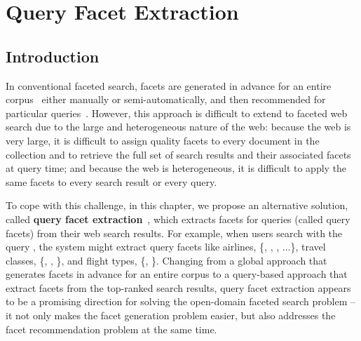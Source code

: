 \chapter{Query Facet Extraction}
\label{ch:facet}
\section{Introduction}
In conventional faceted search, facets are generated in advance for an entire corpus~\cite{stoica2007automating,dakka2008automatic} either manually or semi-automatically, and then recommended for particular queries~\cite{teevan2008challenges}. However, this approach is difficult to extend to faceted web search due to the large and heterogeneous nature of the web: because the web is very large, it is
difficult to assign quality facets to every document in the collection and to retrieve the full set of search results and their associated facets at query time; and because the web is heterogeneous, it is difficult to apply the same facets to every search result or every query.

To cope with this challenge, in this chapter, we propose an alternative solution, called \textbf{query facet extraction}~\cite{kong2013extracting}, which extracts facets for queries (called query facets) from their web search results. For example, when users search with the query , the system might extract query facets like airlines, \{, , , ...\}, travel classes, \{, , \}, and flight types, \{, \}. Changing from a global approach that generates facets in advance for an entire corpus to a query-based approach that extract facets from the top-ranked search results, query facet extraction appears to be a promising direction for solving the open-domain faceted search problem -- it not only makes the facet generation problem easier, but also addresses the facet recommendation problem at the same time.

